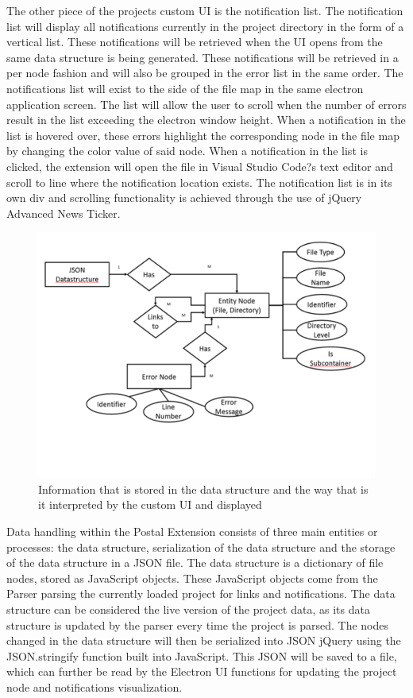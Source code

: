 \documentclass[letterpaper,10pt,titlepage,draftclsnofoot,onecolumn,onesided] {IEEEtran}
\begin{document}
The other piece of the projects custom UI is the notification list. 
The notification list will display all notifications currently in the project directory in the form of a vertical list. 
These notifications will be retrieved when the UI opens from the same data structure is being generated. 
These notifications will be retrieved in a per node fashion and will also be grouped in the error list in the same order.
The notifications list will exist to the side of the file map in the same electron application screen. 
The list will allow the user to scroll when the number of errors result in the list exceeding the electron window height.
When a notification in the list is hovered over, these errors highlight the corresponding node in the file map by changing the color value of said node.
When a notification in the list is clicked, the extension will open the file in Visual Studio Code?s text editor and scroll to line where the notification location exists. 
The notification list is in its own div and scrolling functionality is achieved through the use of jQuery Advanced News Ticker. \\ %

\begin{figure}[h]
	\centering
	\includegraphics[width=.75\textwidth]{UpdatedDataStruct-eps-converted-to}
	\caption{Information that is stored in the data structure and the way that is it interpreted by the custom UI and displayed}
\end{figure}

Data handling within the Postal Extension consists of three main entities or processes: the data structure, serialization of the data structure and the storage of the data structure in a JSON file.
The data structure is a dictionary of file nodes, stored as JavaScript objects. 
These JavaScript objects come from the Parser parsing the currently loaded project for links and notifications.
The data structure can be considered the live version of the project data, as its data structure is updated by the parser every time the project is parsed. 
The nodes changed in the data structure will then be serialized into JSON jQuery using the JSON.stringify function built into JavaScript. 
This JSON will be saved to a file, which can further be read by the Electron UI functions for updating the project node and notifications visualization. \\
\end{document}
